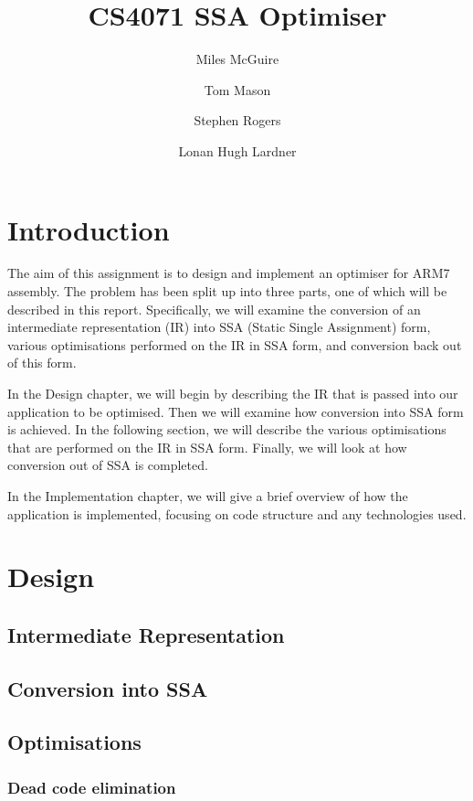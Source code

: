 \documentclass[a4paper,10pt]{report}
\title{CS4071 SSA Optimiser}
\author{
Miles McGuire\\
\and
Tom Mason\\
\and
Stephen Rogers\\
\and
Lonan Hugh Lardner
}
\begin{document}
\maketitle

\tableofcontents

\chapter{Introduction}
The aim of this assignment is to design and implement an optimiser for ARM7 assembly. The problem has been split up
into three parts, one of which will be described in this report. Specifically, we will examine the conversion of an
intermediate representation (IR) into SSA (Static Single Assignment) form, various optimisations performed on the IR 
in SSA form, and conversion back out of this form.

In the Design chapter, we will begin by describing the IR that is passed into our application to be optimised. Then we 
will examine how conversion into SSA form is achieved. In the following section, we will describe the various 
optimisations that are performed on the IR in SSA form. Finally, we will look at how conversion out of SSA is completed.

In the Implementation chapter, we will give a brief overview of how the application is implemented, focusing on code 
structure and any technologies used.

\chapter{Design}

\section{Intermediate Representation}


\section{Conversion into SSA}


\section{Optimisations}


\subsection{Dead code elimination}
\end{document}
